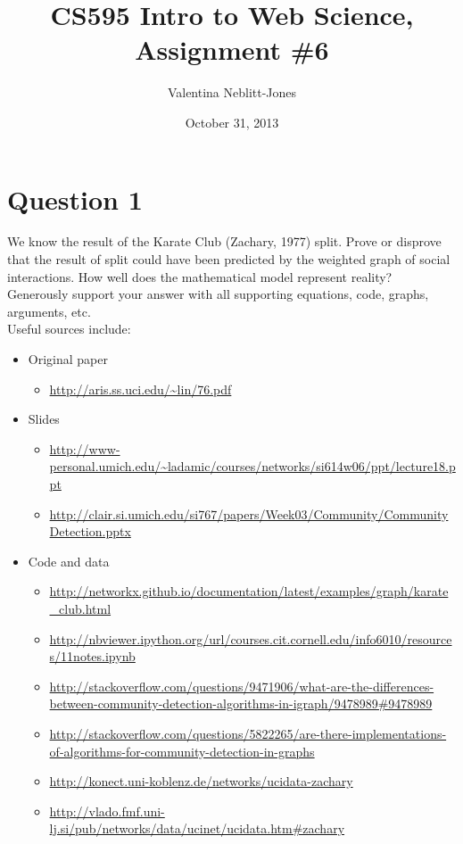 \documentclass{article}
\begin{document}
\title{CS595 Intro to Web Science, Assignment \#6}
\author{Valentina Neblitt-Jones}
\date{October 31, 2013}
\maketitle



\section*{Question 1}

We know the result of the Karate Club (Zachary, 1977) split. Prove or disprove that the result of split could have been predicted by the weighted graph of social interactions. How well does the mathematical model represent reality? \\

Generously support your answer with all supporting equations, code, graphs, arguments, etc. \\

Useful sources include:  \\

\begin{itemize}
\item Original paper
	\begin{itemize}
	\item \url{http://aris.ss.uci.edu/~lin/76.pdf}
	\end{itemize}
\item Slides 
	\begin{itemize}
	\item \url{http://www-personal.umich.edu/~ladamic/courses/networks/si614w06/ppt/lecture18.ppt}
	\item \url{http://clair.si.umich.edu/si767/papers/Week03/Community/CommunityDetection.pptx}
	\end{itemize}
\item{Code and data}
	\begin{itemize}
	\item \url{http://networkx.github.io/documentation/latest/examples/graph/karate_club.html}
	\item \url{http://nbviewer.ipython.org/url/courses.cit.cornell.edu/info6010/resources/11notes.ipynb}
	\item \url{http://stackoverflow.com/questions/9471906/what-are-the-differences-between-community-detection-algorithms-in-igraph/9478989#9478989}
	\item \url{http://stackoverflow.com/questions/5822265/are-there-implementations-of-algorithms-for-community-detection-in-graphs}
	\item \url{http://konect.uni-koblenz.de/networks/ucidata-zachary}
	\item \url{http://vlado.fmf.uni-lj.si/pub/networks/data/ucinet/ucidata.htm#zachary}
	\end{itemize}
\end{itemize}
\end{document}
